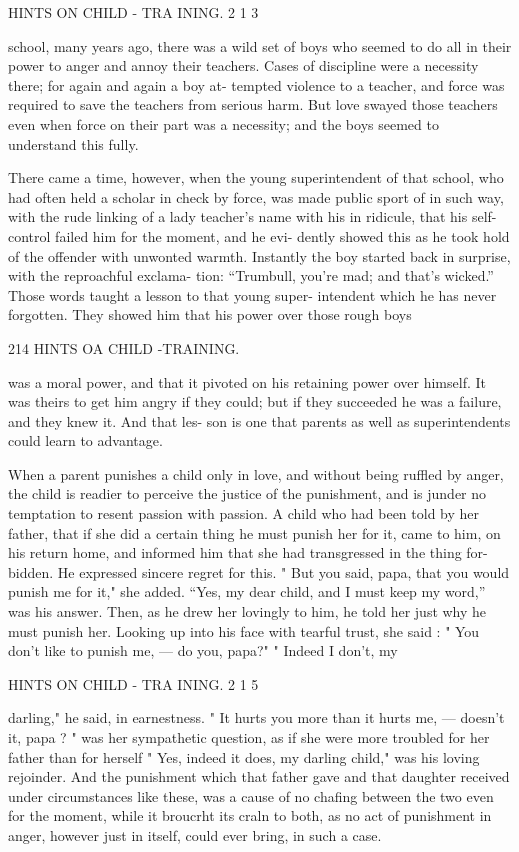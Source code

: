 \documentclass[
]{book}
\begin{document}
HINTS ON CHILD - TRA INING. 2 1 3

school, many years ago, there was a wild set of boys who seemed to do all in their power to anger and annoy their teachers. Cases of discipline were a necessity there; for again and again a boy at- tempted violence to a teacher, and force was required to save the teachers from serious harm. But love swayed those teachers even when force on their part was a necessity; and the boys seemed to understand this fully.

There came a time, however, when the young superintendent of that school, who had often held a scholar in check by force, was made public sport of in such way, with the rude linking of a lady teacher's name with his in ridicule, that his self- control failed him for the moment, and he evi- dently showed this as he took hold of the offender with unwonted warmth. Instantly the boy started back in surprise, with the reproachful exclama- tion: ``Trumbull, you're mad; and that's wicked.'' Those words taught a lesson to that young super- intendent which he has never forgotten. They showed him that his power over those rough boys

214 HINTS OA CHILD -TRAINING.

was a moral power, and that it pivoted on his retaining power over himself. It was theirs to get him angry if they could; but if they succeeded he was a failure, and they knew it. And that les- son is one that parents as well as superintendents could learn to advantage.

When a parent punishes a child only in love, and without being ruffled by anger, the child is readier to perceive the justice of the punishment, and is junder no temptation to resent passion with passion. A child who had been told by her father, that if she did a certain thing he must punish her for it, came to him, on his return home, and informed him that she had transgressed in the thing for- bidden. He expressed sincere regret for this. " But you said, papa, that you would punish me for it," she added. ``Yes, my dear child, and I must keep my word,'' was his answer. Then, as he drew her lovingly to him, he told her just why he must punish her. Looking up into his face with tearful trust, she said : " You don't like to punish me, --- do you, papa?" " Indeed I don't, my

HINTS ON CHILD - TRA INING. 2 1 5

darling," he said, in earnestness. " It hurts you more than it hurts me, --- doesn't it, papa ? " was her sympathetic question, as if she were more troubled for her father than for herself " Yes, indeed it does, my darling child," was his loving rejoinder. And the punishment which that father gave and that daughter received under circumstances like these, was a cause of no chafing between the two even for the moment, while it broucrht its craln to both, as no act of punishment in anger, however just in itself, could ever bring, in such a case.
\end{document}
